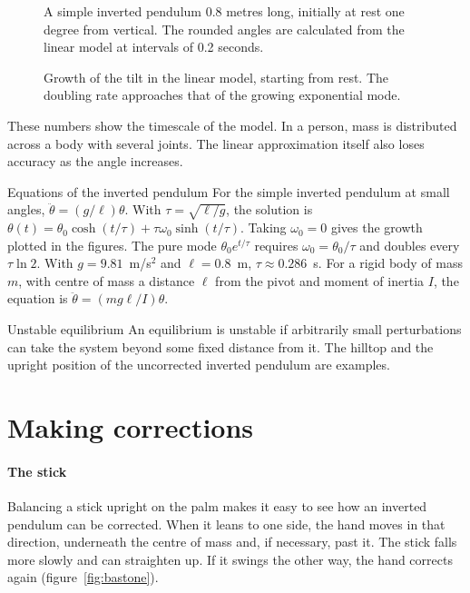 \begin{figure}
\caption{A simple inverted pendulum 0.8 metres long, initially at rest one degree from vertical. The rounded angles are calculated from the linear model at intervals of 0.2 seconds.}
\label{fig:ventaglio}
\end{figure}

\begin{figure}
\caption{Growth of the tilt in the linear model, starting from rest. The doubling rate approaches that of the growing exponential mode.}
\label{fig:raddoppio}
\end{figure}

These numbers show the timescale of the model. In a person, mass is distributed across a body with several joints. The linear approximation itself also loses accuracy as the angle increases.

\begin{formule}{Equations of the inverted pendulum}
For the simple inverted pendulum at small angles, $\ddot{\theta}=(g/\ell)\theta$. With $\tau=\sqrt{\ell/g}$, the solution is $\theta(t)=\theta_0\cosh(t/\tau)+\tau\omega_0\sinh(t/\tau)$. Taking $\omega_0=0$ gives the growth plotted in the figures. The pure mode $\theta_0e^{t/\tau}$ requires $\omega_0=\theta_0/\tau$ and doubles every $\tau\ln2$. With $g=9.81$~m/s$^2$ and $\ell=0.8$~m, $\tau\approx0.286$~s. For a rigid body of mass $m$, with centre of mass a distance $\ell$ from the pivot and moment of inertia $I$, the equation is $\ddot{\theta}=(mg\ell/I)\theta$.
\end{formule}

\begin{parola}{Unstable equilibrium}
An equilibrium is unstable if arbitrarily small perturbations can take the system beyond some fixed distance from it. The hilltop and the upright position of the uncorrected inverted pendulum are examples.
\end{parola}

\section{Making corrections}\label{sec:correggere}

\paragraph{The stick} Balancing a stick upright on the palm makes it easy to see how an inverted pendulum can be corrected. When it leans to one side, the hand moves in that direction, underneath the centre of mass and, if necessary, past it. The stick falls more slowly and can straighten up. If it swings the other way, the hand corrects again (figure~\ref{fig:bastone}).

